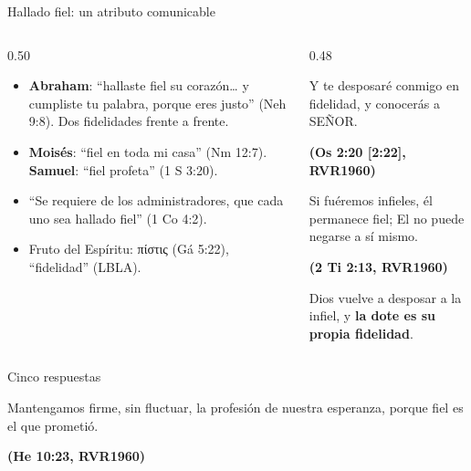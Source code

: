 \documentclass[hyperref={bookmarks=false},aspectratio=169]{beamer}
\newcommand{\grc}[1]{\foreignlanguage{ancientgreek}{#1}}
\newcommand{\SENOR}{S{\fontsize{0.78em}{1em}\selectfont EÑOR}}
\newcommand{\fuente}[1]{\par\hfill{\upshape\bfseries\footnotesize\textcolor{azul}{#1}}}
\newcommand{\destacar}[1]{\textbf{\textcolor{azul}{#1}}}
\begin{document}
\begin{frame}{Hallado fiel: un atributo comunicable}
\begin{columns}[t,onlytextwidth]
\begin{column}{0.50\textwidth}\small
\begin{itemize}
\item \destacar{Abraham}: ``hallaste fiel su corazón\ldots{} y cumpliste tu palabra, porque eres justo'' (Neh 9:8). Dos fidelidades frente a frente.
\item \destacar{Moisés}: ``fiel en toda mi casa'' (Nm 12:7). \destacar{Samuel}: ``fiel profeta'' (1 S 3:20).
\item ``Se requiere de los administradores, que cada uno sea hallado fiel'' (1 Co 4:2).
\item Fruto del Espíritu: \grc{πίστις} (Gá 5:22), ``fidelidad'' (LBLA).
\end{itemize}
\end{column}
\begin{column}{0.48\textwidth}
\begin{cita}Y te desposaré conmigo en fidelidad, y conocerás a \SENOR.\fuente{(Os 2:20 [2:22], RVR1960)}\end{cita}
\begin{cita}Si fuéremos infieles, él permanece fiel; El no puede negarse a sí mismo.\fuente{(2 Ti 2:13, RVR1960)}\end{cita}
\scriptsize Dios vuelve a desposar a la infiel, y \destacar{la dote es su propia fidelidad}.
\end{column}
\end{columns}
\end{frame}

\begin{frame}{Cinco respuestas}
\par\medskip
\begin{cita}Mantengamos firme, sin fluctuar, la profesión de nuestra esperanza, porque fiel es el que prometió.\fuente{(He 10:23, RVR1960)}\end{cita}
\end{frame}
\end{document}

